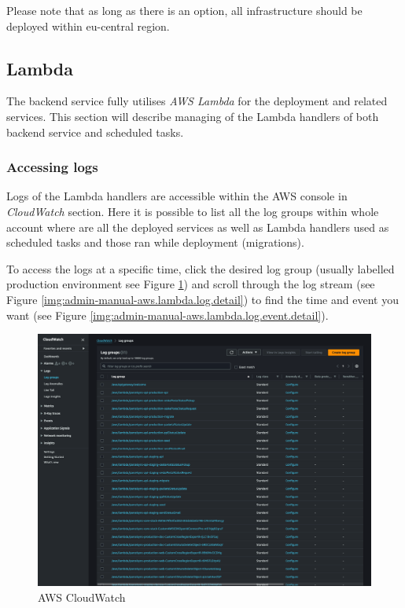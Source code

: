 Please note that as long as there is an option, all infrastructure should be deployed within eu-central region.

\subsection{Lambda}
The backend service fully utilises \textit{AWS Lambda} for the deployment and related services. 
This section will describe managing of the Lambda handlers of both backend service and scheduled tasks.

\subsubsection{Accessing logs}
Logs of the Lambda handlers are accessible within the AWS console in \textit{CloudWatch} section.
Here it is possible to list all the log groups within whole account where are all the deployed services as well as Lambda handlers used as scheduled tasks and those ran while deployment (migrations).

To access the logs at a specific time, click the desired log group (usually labelled production environment see Figure \ref{img:admin-manual-aws.lambda.log}) and scroll through the log stream (see Figure \ref{img:admin-manual-aws.lambda.log.detail}) to find the time and event you want (see Figure \ref{img:admin-manual-aws.lambda.log.event.detail}).

\begin{figure}[H]\centering
\includegraphics[width=140mm]{img/docs/fig_aws_cloudwatch.png}
\caption{AWS CloudWatch}
\label{img:admin-manual-aws.lambda.log}
\end{figure}

